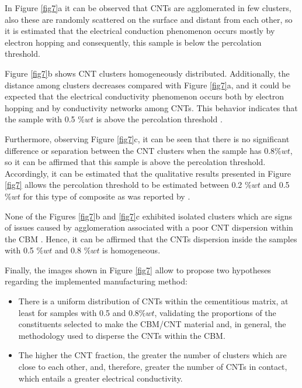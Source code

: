 \documentclass[twocolumn]{bmcart}%
\begin{document}
In Figure \ref{fig7}a it can be observed that CNTs are agglomerated in few clusters, also these are randomly scattered on the surface and distant from each other, so it is estimated that the electrical conduction phenomenon occurs mostly by electron hopping \cite{Balberg1984, Garcia-Macias2017} and consequently, this sample is below the percolation threshold. 

Figure \ref{fig7}b shows CNT clusters homogeneously distributed. Additionally, the distance among clusters decreases compared with Figure \ref{fig7}a, and it could be expected that the electrical conductivity phenomenon occurs both by electron hopping and by conductivity networks among CNTs. This behavior indicates that the sample with 0.5 $\%wt$ is above the percolation threshold \cite{Balberg1984, Garcia-Macias2017}.

Furthermore, observing Figure \ref{fig7}c, it can be seen that there is no significant difference or separation between the CNT clusters when the sample has 0.8$\%wt$, so it can be affirmed that this sample is above the percolation threshold. Accordingly, it can be estimated that the qualitative results presented in Figure \ref{fig7} allows the percolation threshold to be estimated between 0.2 $\%wt$ and 0.5 $\%wt$ for this type of composite as was reported by \citet{Souri2017, Garcia-Macias2017, Hoseini2017}. 

None of the Figures \ref{fig7}b and \ref{fig7}c exhibited isolated clusters which are signs of issues caused by agglomeration associated with a poor CNT dispersion within the CBM \cite{Nam2015, Wang2015}. Hence, it can be affirmed that the CNTs dispersion inside the samples with 0.5 $\%wt$ and 0.8 $\%wt$ is homogeneous. 

Finally, the images shown in Figure \ref{fig7} allow to propose two hypotheses regarding the implemented manufacturing method:

\begin{itemize}
    

\item  There is a uniform distribution of CNTs within the cementitious matrix, at least for samples with 0.5  and 0.8$\%wt$, validating the proportions of the constituents selected to make the CBM/CNT material and, in general, the methodology used to disperse the CNTs within the CBM.
\item 	The higher the CNT fraction, the greater the number of clusters which are close to each other, and, therefore, greater the number of CNTs in contact, which entails a greater electrical conductivity.

\end{itemize}
\end{document}
